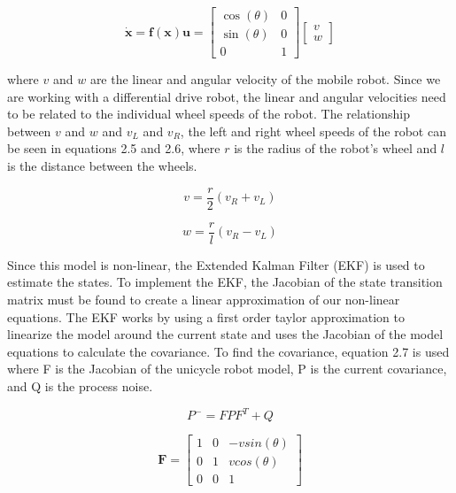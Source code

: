 \begin{equation}
  \boldsymbol{\dot{x}} = \boldsymbol{f(x) }\boldsymbol{u} = 
  \begin{bmatrix}
      \cos(\theta) & 0 \\
      \sin(\theta) & 0 \\
      0 & 1
  \end{bmatrix}
  \begin{bmatrix}
      v \\
      w
  \end{bmatrix}
\end{equation}

where $v$ and $w$ are the linear and angular velocity of the mobile robot. Since we 
are working with a differential drive robot, the linear and angular velocities need 
to be related to the individual wheel speeds of the robot. The relationship 
between $v$ and $w$ and $v_L$ and $v_R$, the left and right wheel speeds of the robot 
can be seen in equations 2.5 and 2.6, where $r$ is the radius of the robot's wheel and 
$l$ is the distance between the wheels. 

\begin{equation}
  v = \frac{r}{2} (v_R + v_L)
\end{equation}

\begin{equation}
  w = \frac{r}{l} (v_R - v_L)
\end{equation}

Since this model is non-linear, the Extended Kalman Filter (EKF) is used to estimate 
the states. To implement the EKF, the Jacobian of the state transition matrix must be 
found to create a linear approximation of our non-linear equations. The EKF works by 
using a first order taylor approximation to linearize the model around the current 
state and uses the Jacobian of the model equations to calculate the covariance. To 
find the covariance, equation 2.7 is used where F is the Jacobian of the unicycle 
robot model, P is the current covariance, and Q is the process noise. 

\begin{equation}
  P^- = FPF^T + Q
\end{equation}

\begin{equation}
  \boldsymbol{F} = \begin{bmatrix}
    1 & 0 & -vsin(\theta) \\
    0 & 1 &  vcos(\theta) \\
    0 & 0 &       1
  \end{bmatrix}
\end{equation}

